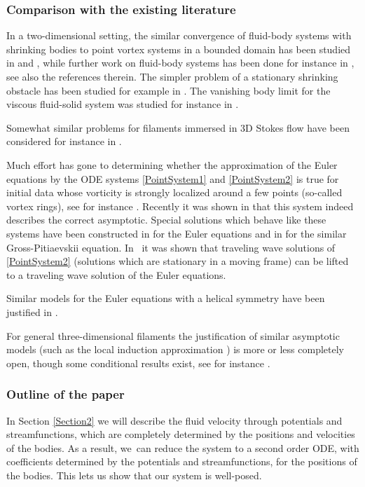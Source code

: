 \documentclass[JEP,XML,SOM,Unicode,published]{cedram}
\theoremstyle{definition}
\begin{document}
\subsubsection*{Comparison with the existing literature}
In a two-dimensional setting, the similar convergence of fluid-body systems with shrinking bodies to point vortex systems in a bounded domain has been studied in \cite{GlassMunnierSueur1} and \cite{GlassSueur3}, while further work on fluid-body systems has been done for instance in \cite{GlassMunnierSueur2,glass2015uniqueness,HouotMunnier4,Munnier5}, see also the references therein. The simpler problem of a stationary shrinking obstacle has been studied for example in \cite{he2019small,iftimie2003two,iftimie2009incompressible}. The vanishing body limit for the viscous fluid-solid system was studied for instance in \cite{he2024vanishing,lacave2017small}.

Somewhat similar problems for filaments immersed in 3D Stokes flow have been considered for instance in \cite{MR4373666,mori2020theoretical}.

Much effort has gone to determining whether the approximation of the Euler equations by the ODE systems \eqref{PointSystem1} and \eqref{PointSystem2} is true for initial data whose vorticity is strongly localized around a few points (so-called vortex rings), see for instance \cite{benedetto2000motion,butta2022vanishing, ButtaMarchioro}. Recently it was shown in \cite{butta2023leapfrogging} that this system indeed describes the correct asymptotic. Special solutions which behave like these systems have been constructed in \cite{Davila2022leapfrogging} for the Euler equations and in \cite{JerrardSmets} for the similar Gross-Pitiaevskii equation. In~\cite{ao2022clustered} it was shown that traveling wave solutions of \eqref{PointSystem2} (\ie solutions which are stationary in a moving frame) can be lifted to a traveling wave solution of the Euler equations.

Similar models for the Euler equations with a helical symmetry have been justified \eg in \cite{donati2024dynamics}.

For general three-dimensional filaments the justification of similar asymptotic models (such as the local induction approximation \cite[\S 2]{banica2013evolution}) is more or less completely open, though some conditional results exist, see for instance \cite{jerrard2017vortex}.

\subsubsection*{Outline of the paper}
In Section \ref{Section2} we will describe the fluid velocity through potentials and streamfunctions, which are completely determined by the positions and velocities of the bodies. As a result, we~can reduce the system to a second order ODE, with coefficients determined by the potentials and streamfunctions, for the positions of the bodies. This lets us show that our system is well-posed.
\end{document}
